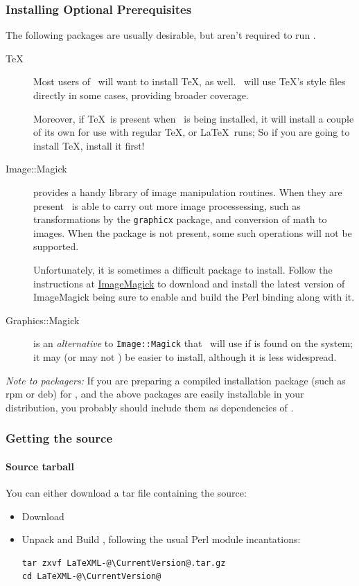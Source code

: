 \documentclass{article}
\begin{document}
\subsubsection{Installing Optional Prerequisites}\label{install.optional}
The following packages are usually desirable, but aren't required to run \LaTeXML.
\begin{description}
\item[\TeX] Most users of \LaTeXML\ will want to install \TeX, as well.  \LaTeXML\ will
use \TeX's style files directly in some cases, providing broader coverage.

Moreover, if \TeX\ is present when \LaTeXML\ is being installed, it will install a couple of
its own for use with regular \TeX, or \LaTeX\ runs;
So if you are going to install \TeX, install it first!

\item[Image::Magick] provides a handy library of image manipulation routines.
When they are present \LaTeXML\ is able to carry out more image processessing,
such as transformations by the \texttt{graphicx} package, and conversion of math to images.
When the package is not present, some such operations will not be supported.

Unfortunately, it is sometimes a difficult package to install.
Follow the instructions at \href{http://www.imagemagick.org/}{ImageMagick}
to download and install the latest version of ImageMagick being sure to enable
and build the Perl binding along with it.

\item[Graphics::Magick] is an \emph{alternative} to \texttt{Image::Magick} that \LaTeXML\ will
use if is found on the system; it may (or may not ) be easier to install, although it
is less widespread.
\end{description}
\emph{Note to packagers:} If you are preparing a compiled installation package (such as rpm or deb) for
\LaTeXML, and the above packages are easily installable in your distribution,
you probably should include them as dependencies of \LaTeXML.

\subsubsection{Getting the source}\label{getting.source}
\paragraph{Source tarball}\label{source.tarball}
You can either download a tar file containing the source:
\begin{itemize}
\item Download \CurrentTarball
\item Unpack and Build \LaTeXML, following the usual Perl module incantations:
\begin{lstlisting}[style=shell]
tar zxvf LaTeXML-@\CurrentVersion@.tar.gz
cd LaTeXML-@\CurrentVersion@
\end{lstlisting}
\end{itemize}
\end{document}
